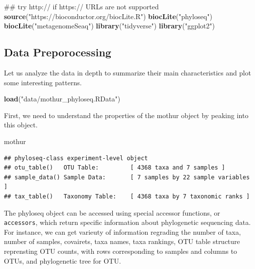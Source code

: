 \documentclass[11 pt,]{article}
\newenvironment{Shaded}{\begin{snugshade}}{\end{snugshade}}
\newcommand{\KeywordTok}[1]{\textcolor[rgb]{0.13,0.29,0.53}{\textbf{#1}}}
\newcommand{\StringTok}[1]{\textcolor[rgb]{0.31,0.60,0.02}{#1}}
\newcommand{\NormalTok}[1]{#1}
\begin{document}
\begin{Shaded}
\begin{Highlighting}[]
\NormalTok{## try http:// if https:// URLs are not supported}
\KeywordTok{source}\NormalTok{(}\StringTok{"https://bioconductor.org/biocLite.R"}\NormalTok{)  }
\KeywordTok{biocLite}\NormalTok{(}\StringTok{"phyloseq"}\NormalTok{)}
\KeywordTok{biocLite}\NormalTok{(}\StringTok{"metagenomeSeaq"}\NormalTok{)}
\KeywordTok{library}\NormalTok{(}\StringTok{"tidyverse"}\NormalTok{)}
\KeywordTok{library}\NormalTok{(}\StringTok{"ggplot2"}\NormalTok{)}
\end{Highlighting}
\end{Shaded}

\subsection{Data Preporocessing}\label{data-preporocessing}

Let us analyze the data in depth to summarize their main characteristics
and plot some interesting patterns.

\begin{Shaded}
\begin{Highlighting}[]
\KeywordTok{load}\NormalTok{(}\StringTok{"data/mothur_phyloseq.RData"}\NormalTok{)}
\end{Highlighting}
\end{Shaded}

First, we need to understand the properties of the mothur object by
peaking into this object.

\begin{Shaded}
\begin{Highlighting}[]
\NormalTok{mothur}
\end{Highlighting}
\end{Shaded}

\begin{verbatim}
## phyloseq-class experiment-level object
## otu_table()   OTU Table:         [ 4368 taxa and 7 samples ]
## sample_data() Sample Data:       [ 7 samples by 22 sample variables ]
## tax_table()   Taxonomy Table:    [ 4368 taxa by 7 taxonomic ranks ]
\end{verbatim}

The phyloseq object can be accessed using special accessor functions, or
\texttt{accessors}, which return specific information about phylogenetic
sequencing data. For instance, we can get varieuty of information
regrading the number of taxa, number of samples, covairets, taxa names,
taxa rankings, OTU table structure reprensting OTU counts, with rows
corresponding to samples and columns to OTUs, and phylogenetic tree for
OTU.
\end{document}
